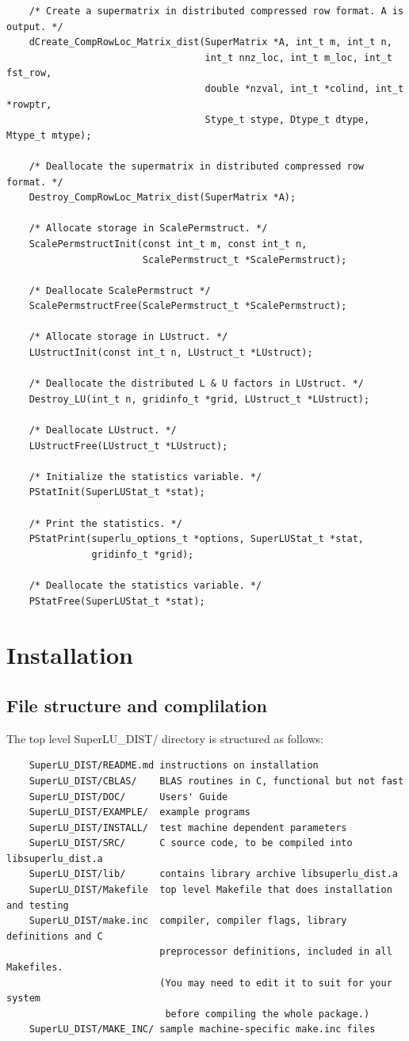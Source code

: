 \begin{verbatim}
    /* Create a supermatrix in distributed compressed row format. A is output. */
    dCreate_CompRowLoc_Matrix_dist(SuperMatrix *A, int_t m, int_t n,
                                   int_t nnz_loc, int_t m_loc, int_t fst_row,
                                   double *nzval, int_t *colind, int_t *rowptr,
                                   Stype_t stype, Dtype_t dtype, Mtype_t mtype);

    /* Deallocate the supermatrix in distributed compressed row format. */
    Destroy_CompRowLoc_Matrix_dist(SuperMatrix *A);

    /* Allocate storage in ScalePermstruct. */
    ScalePermstructInit(const int_t m, const int_t n,
                        ScalePermstruct_t *ScalePermstruct);

    /* Deallocate ScalePermstruct */
    ScalePermstructFree(ScalePermstruct_t *ScalePermstruct);

    /* Allocate storage in LUstruct. */
    LUstructInit(const int_t n, LUstruct_t *LUstruct);

    /* Deallocate the distributed L & U factors in LUstruct. */
    Destroy_LU(int_t n, gridinfo_t *grid, LUstruct_t *LUstruct);

    /* Deallocate LUstruct. */
    LUstructFree(LUstruct_t *LUstruct);

    /* Initialize the statistics variable. */
    PStatInit(SuperLUStat_t *stat);

    /* Print the statistics. */
    PStatPrint(superlu_options_t *options, SuperLUStat_t *stat,
               gridinfo_t *grid);

    /* Deallocate the statistics variable. */
    PStatFree(SuperLUStat_t *stat);
\end{verbatim}


\section{Installation}
\label{sec:dist_install}
\subsection{File structure and complilation}
The top level SuperLU\_DIST/ directory is structured as follows:
\begin{verbatim}
    SuperLU_DIST/README.md instructions on installation
    SuperLU_DIST/CBLAS/    BLAS routines in C, functional but not fast
    SuperLU_DIST/DOC/      Users' Guide
    SuperLU_DIST/EXAMPLE/  example programs
    SuperLU_DIST/INSTALL/  test machine dependent parameters
    SuperLU_DIST/SRC/      C source code, to be compiled into libsuperlu_dist.a
    SuperLU_DIST/lib/      contains library archive libsuperlu_dist.a
    SuperLU_DIST/Makefile  top level Makefile that does installation and testing
    SuperLU_DIST/make.inc  compiler, compiler flags, library definitions and C
                           preprocessor definitions, included in all Makefiles.
                           (You may need to edit it to suit for your system
                            before compiling the whole package.)
    SuperLU_DIST/MAKE_INC/ sample machine-specific make.inc files
\end{verbatim}

